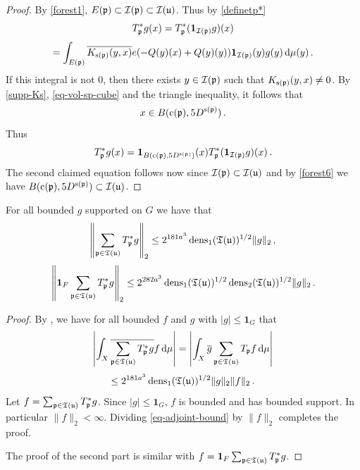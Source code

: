 \begin{proof}
    \leanok
    By \eqref{forest1}, $E({\mathfrak p}) \subset {\mathcal{I}}({\mathfrak p}) \subset {\mathcal{I}}({\mathfrak u})$. Thus by \eqref{definetp*}
    $$
         T_{{\mathfrak p}}^* g(x) = T_{{\mathfrak p}}^* (\mathbf{1}_{{\mathcal{I}}({\mathfrak p})} g)(x)
    $$
    $$
        = \int_{E({\mathfrak p})} \overline{K_{{\mathrm{s}}({\mathfrak p})}(y,x)} e(-{Q}(y)(x) + {Q}(y)(y)) \mathbf{1}_{{\mathcal{I}}({\mathfrak p})}(y) g(y) \, \mathrm{d}\mu(y)\,.
    $$
    If this integral is not $0$, then there exists $y \in {\mathcal{I}}({\mathfrak p})$ such that $K_{{\mathrm{s}}({\mathfrak p})}(y,x) \ne 0$. By \eqref{supp-Ks}, \eqref{eq-vol-sp-cube} and the triangle inequality, it follows that
    \begin{equation*}
        x \in B({\mathrm{c}}({\mathfrak p}), 5 D^{{\mathrm{s}}({\mathfrak p})})\, .
    \end{equation*}
    Thus
    $$
        T_{{\mathfrak p}}^* g(x) = \mathbf{1}_{B({\mathrm{c}}({\mathfrak p}), 5D^{{\mathrm{s}}({\mathfrak p})})}(x) T_{{\mathfrak p}}^* (\mathbf{1}_{{\mathcal{I}}({\mathfrak p})} g)(x)\,.
    $$
    The second claimed equation follows now since ${\mathcal{I}}({\mathfrak p}) \subset {\mathcal{I}}({\mathfrak u})$ and by \eqref{forest6} we have $B({\mathrm{c}}({\mathfrak p}), 5D^{{\mathrm{s}}({\mathfrak p})}) \subset {\mathcal{I}}({\mathfrak u})$.
\end{proof}

\begin{lemma}
    \label{adjoint-tree-estimate}
    \leanok
    For all bounded $g$ supported on $G$ we have that
    $$
        \left\| \sum_{{\mathfrak p} \in {\mathfrak T}({\mathfrak u})} T_{{\mathfrak p}}^* g\right\|_2 \le 2^{181a^3} \operatorname{\operatorname{dens}}_1({\mathfrak T}({\mathfrak u}))^{1/2} \|g\|_2\,,
    $$
    $$
        \left\| \mathbf{1}_F \sum_{{\mathfrak p} \in {\mathfrak T}({\mathfrak u})} T_{{\mathfrak p}}^* g\right\|_2 \le 2^{282a^3} \operatorname{\operatorname{dens}}_1({\mathfrak T}({\mathfrak u}))^{1/2} \operatorname{\operatorname{dens}}_2({\mathfrak T}({\mathfrak u}))^{1/2} \|g\|_2\,.
    $$
\end{lemma}

\begin{proof}
    \leanok
    By , we have for all bounded $f$ and $g$ with $|g| \le \mathbf{1}_G$ that
    $$
        \left| \int_X \overline{\sum_{{\mathfrak p}\in {\mathfrak T}({\mathfrak u})} T_{{\mathfrak p}}^* g} f \,\mathrm{d}\mu \right| = \left| \int_X \overline{g} \sum_{{\mathfrak p} \in {\mathfrak T}({\mathfrak u})} T_{{\mathfrak p}} f \,\mathrm{d}\mu \right|
    $$
    \begin{equation}
        \label{eq-adjoint-bound}
        \le 2^{181a^3} \operatorname{\operatorname{dens}}_1({\mathfrak T}({\mathfrak u}))^{1/2} \|g\|_2 \|f\|_2\,.
    \end{equation}
    Let $f = \sum_{{\mathfrak p} \in {\mathfrak T}({\mathfrak u})} T_{{\mathfrak p}}^* g$. Since $|g| \le \mathbf{1}_G$, $f$ is bounded and has bounded support. In particular $\|f\|_2 < \infty$. Dividing \eqref{eq-adjoint-bound} by $\|f\|_2$ completes the proof.

    The proof of the second part is similar with $f = \mathbf{1}_F \sum_{{\mathfrak p} \in {\mathfrak T}({\mathfrak u})} T_{{\mathfrak p}}^* g$.
\end{proof}


